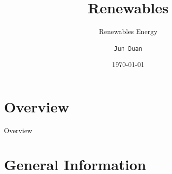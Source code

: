 \documentclass[newPxFont,numfooter,sectionpages]{beamer}
\title{Renewables}
\subtitle{Renewables Energy}
\date{\today}
\author{\texttt{Jun Duan}}
\institute{University of Victoria}
\begin{document}
%
%

\maketitle







%
%

\section*{Overview}
\begin{frame}{Overview}
\tableofcontents
\end{frame}

%
%

\section{General Information}

\end{document}
